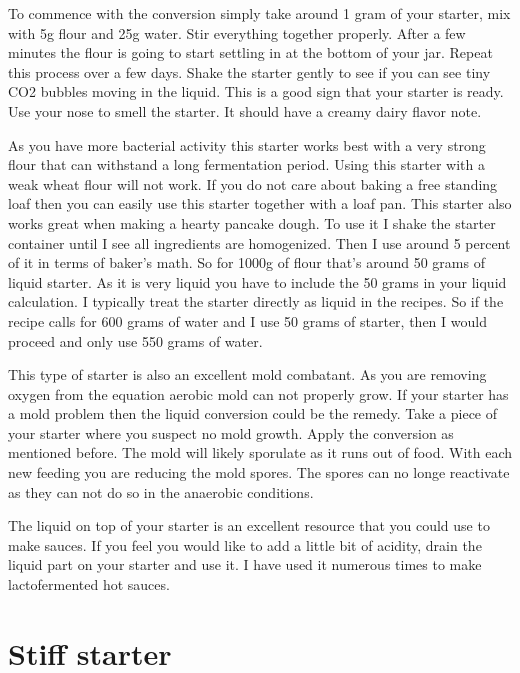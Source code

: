 To commence with the
conversion simply take around 1 gram of your starter, mix with 5g flour and
25g water. Stir everything together properly. After a few minutes the flour is
going to start settling in at the bottom of your jar. Repeat this process over
a few days. Shake the starter gently to see if you can see tiny CO2 bubbles
moving in the liquid. This is a good sign that your starter is ready. Use your
nose to smell the starter. It should have a creamy dairy flavor note.

As you have more bacterial activity this starter works best with a very strong
flour that can withstand a long fermentation period. Using this starter with a
weak wheat flour will not work. If you do not care about baking a free
standing loaf then you can easily use this starter together with a loaf pan.
This starter also works great when making a hearty pancake dough. To use it I
shake the starter container until I see all ingredients are homogenized. Then
I use around 5 percent of it in terms of baker's math. So for 1000g of flour
that's around 50 grams of liquid starter. As it is very liquid you have to
include the 50 grams in your liquid calculation. I typically treat the starter
directly as liquid in the recipes. So if the recipe calls for 600 grams of water
and I use 50 grams of starter, then I would proceed and only use 550 grams of
water.

This type of starter is also an excellent mold combatant. As you are removing
oxygen from the equation aerobic mold can not properly grow. If your starter
has a mold problem then the liquid conversion could be the remedy. Take a
piece of your starter where you suspect no mold growth. Apply the conversion
as mentioned before. The mold will likely sporulate as it runs out of food.
With each new feeding you are reducing the mold spores. The spores can no
longe reactivate as they can not do so in the anaerobic conditions.

The liquid on top of your starter is an excellent resource that you could use
to make sauces. If you feel you would like to add a little bit of acidity,
drain the liquid part on your starter and use it. I have used it numerous
times to make lactofermented hot sauces.

\section{Stiff starter}
\label{section:stiff-starter}

